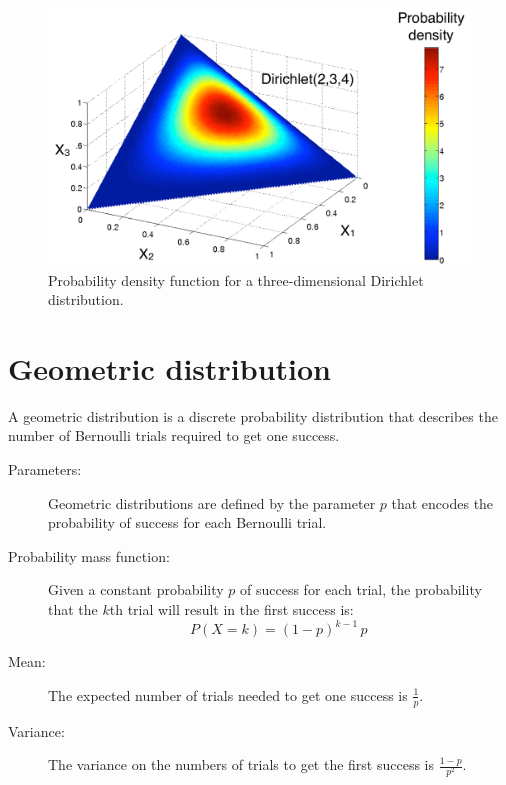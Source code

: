 \begin{figure}[h!]
\centering
\includegraphics[scale=0.40]{imgs/dirichlet_appendix.pdf}
\caption{Probability density function for a three-dimensional Dirichlet distribution.} 
\label{fig:dirichlet-appendix}
\end{figure}



\section*{Geometric distribution}

A geometric distribution is a discrete probability distribution that describes the number of Bernoulli trials required to get one success. 

\begin{description}
\item [Parameters: ] Geometric distributions are defined by the parameter $p$ that encodes the probability of success for each Bernoulli trial. 

\item [Probability mass function: ] Given a constant probability $p$ of success for each trial, the probability that the $k$th trial will result in the first success is:
\begin{equation}
P(X = k) = (1-p)^{k-1}\,p\,
\end{equation}

\item [Mean: ] The expected number of trials needed to get one success is $\frac{1}{p}$.

\item [Variance: ] The variance on the numbers of trials to get the first success is $\frac{1-p}{p^2}$. 

\end{description}


